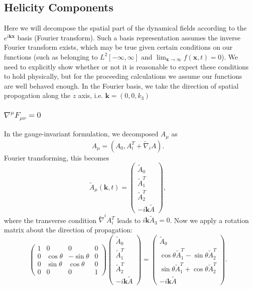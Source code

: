 \documentclass[10pt,letterpaper]{article}
\numberwithin{equation}{subsection}
\begin{document}
\subsection{Helicity Components}
Here we will decompose the spatial part of the dynamical fields according to the $e^{i\mathbf k \mathbf x}$ basis (Fourier transform). Such a basis representation assumes the inverse Fourier transform exists, which may be true given certain conditions on our functions (such as belonging to $L^2[-\infty,\infty]$ and $\lim_{\mathbf x\to\infty}f(\mathbf x,t) = 0$). We need to explicitly show whether or not it is reasonable to expect these conditions to hold physically, but for the proceeding calculations we assume our functions are well behaved enough. In the Fourier basis, we take the direction of spatial propogation along the $z$ axis, i.e. $\mathbf k = (0,0,k_3)$
\subsubsection{$\nabla^\mu F_{\mu\nu} = 0$}
In the gauge-invariant formulation, we decomposed $A_{\mu}$ as
\begin{equation}
A_\mu = (A_0, A_i^T + \tilde\nabla_i A).
\end{equation}
Fourier transforming, this becomes
\begin{equation}
\tilde A_{\mu}(\mathbf k,t) = 
\begin{pmatrix}
\tilde A_0 \\ \tilde A^T_1 \\ \tilde A^T_2 \\ -i \mathbf k \tilde A
\end{pmatrix},
\end{equation}
where the transverse condition $\tilde\nabla^i  A_i^T$ leads to $i \mathbf k \tilde A_3 = 0$. Now we apply a rotation matrix about the direction of propagation:
\begin{equation}
\begin{pmatrix}
1&0&0&0\\
0&\cos\theta&-\sin\theta&0\\
0&\sin\theta&\cos\theta&0\\
0&0&0&1
\end{pmatrix}
\begin{pmatrix}
\tilde A_0 \\ \tilde A^T_1 \\ \tilde A^T_2 \\ -i \mathbf k \tilde A
\end{pmatrix}
=
\begin{pmatrix}
\tilde A_0 \\ \cos\theta \tilde A^T_1 -\sin\theta \tilde A^T_2\\ \sin\theta \tilde A_1^T +\cos\theta \tilde A^T_2 \\ -i \mathbf k \tilde A
\end{pmatrix}.
\end{equation}
\end{document}
